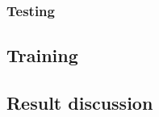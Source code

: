 \subsubsection{Testing}
\paragraph{}
\subsection{Training}
\paragraph{}
\subsection{Result discussion}
\paragraph{}
\newpage

